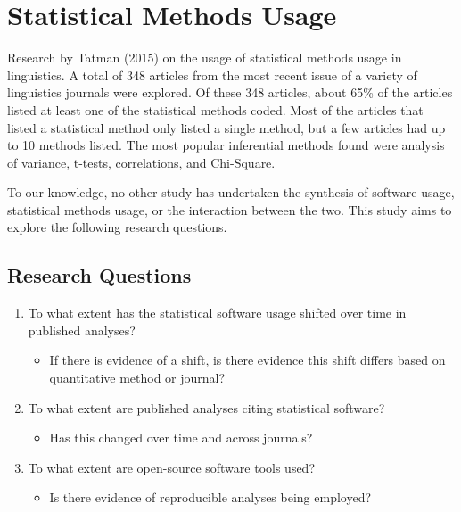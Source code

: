 \documentclass[english,,man]{apa6}
\providecommand{\tightlist}{%
  \setlength{\itemsep}{0pt}\setlength{\parskip}{0pt}}
\begin{document}
\hypertarget{statistical-methods-usage}{%
\section{Statistical Methods Usage}\label{statistical-methods-usage}}

Research by Tatman (2015) on the usage of statistical methods usage in linguistics. A total of 348 articles from the most recent issue of a variety of linguistics journals were explored. Of these 348 articles, about 65\% of the articles listed at least one of the statistical methods coded. Most of the articles that listed a statistical method only listed a single method, but a few articles had up to 10 methods listed. The most popular inferential methods found were analysis of variance, t-tests, correlations, and Chi-Square.

To our knowledge, no other study has undertaken the synthesis of software usage, statistical methods usage, or the interaction between the two. This study aims to explore the following research questions.

\hypertarget{research-questions}{%
\subsection{Research Questions}\label{research-questions}}

\begin{enumerate}
\def\labelenumi{\arabic{enumi}.}
\tightlist
\item
  To what extent has the statistical software usage shifted over time in published analyses?

  \begin{itemize}
  \tightlist
  \item
    If there is evidence of a shift, is there evidence this shift differs based on quantitative method or journal?
  \end{itemize}
\item
  To what extent are published analyses citing statistical software?

  \begin{itemize}
  \tightlist
  \item
    Has this changed over time and across journals?
  \end{itemize}
\item
  To what extent are open-source software tools used?

  \begin{itemize}
  \tightlist
  \item
    Is there evidence of reproducible analyses being employed?
  \end{itemize}
\end{enumerate}
\end{document}
